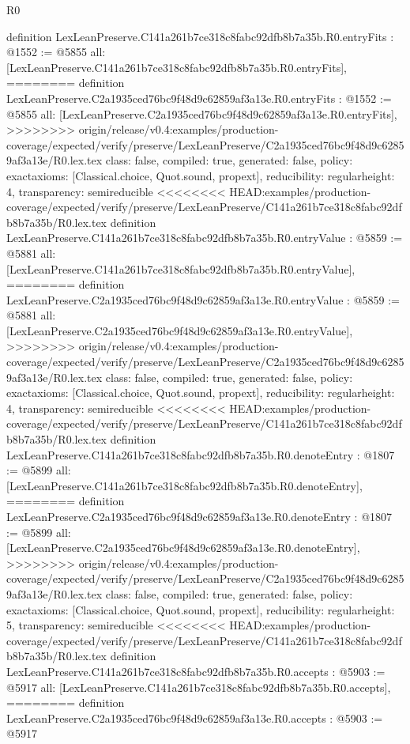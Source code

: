 \begin{lexlean}{R0}
\begin{coremodule}
{{{{{{{{{{{{{{{{{{{{{{{{{{{{{{{{{{{{{{{{{{{{{{{{{{{{{{{{{{{{{{{{{{{{{{{{{{{{{{{{{{{{{{{{{{{{{{{{{{definition LexLeanPreserve.C141a261b7ce318c8fabc92dfb8b7a35b.R0.entryFits : @1552 := @5855 {
  all: [LexLeanPreserve.C141a261b7ce318c8fabc92dfb8b7a35b.R0.entryFits],
========
definition LexLeanPreserve.C2a1935ced76bc9f48d9c62859af3a13e.R0.entryFits : @1552 := @5855 {
  all: [LexLeanPreserve.C2a1935ced76bc9f48d9c62859af3a13e.R0.entryFits],
>>>>>>>> origin/release/v0.4:examples/production-coverage/expected/verify/preserve/LexLeanPreserve/C2a1935ced76bc9f48d9c62859af3a13e/R0.lex.tex
  class: false,
  compiled: true,
  generated: false,
  policy: exact{axioms: [Classical.choice, Quot.sound, propext]},
  reducibility: regular{height: 4},
  transparency: semireducible
}
<<<<<<<< HEAD:examples/production-coverage/expected/verify/preserve/LexLeanPreserve/C141a261b7ce318c8fabc92dfb8b7a35b/R0.lex.tex
definition LexLeanPreserve.C141a261b7ce318c8fabc92dfb8b7a35b.R0.entryValue : @5859 := @5881 {
  all: [LexLeanPreserve.C141a261b7ce318c8fabc92dfb8b7a35b.R0.entryValue],
========
definition LexLeanPreserve.C2a1935ced76bc9f48d9c62859af3a13e.R0.entryValue : @5859 := @5881 {
  all: [LexLeanPreserve.C2a1935ced76bc9f48d9c62859af3a13e.R0.entryValue],
>>>>>>>> origin/release/v0.4:examples/production-coverage/expected/verify/preserve/LexLeanPreserve/C2a1935ced76bc9f48d9c62859af3a13e/R0.lex.tex
  class: false,
  compiled: true,
  generated: false,
  policy: exact{axioms: [Classical.choice, Quot.sound, propext]},
  reducibility: regular{height: 4},
  transparency: semireducible
}
<<<<<<<< HEAD:examples/production-coverage/expected/verify/preserve/LexLeanPreserve/C141a261b7ce318c8fabc92dfb8b7a35b/R0.lex.tex
definition LexLeanPreserve.C141a261b7ce318c8fabc92dfb8b7a35b.R0.denoteEntry : @1807 := @5899 {
  all: [LexLeanPreserve.C141a261b7ce318c8fabc92dfb8b7a35b.R0.denoteEntry],
========
definition LexLeanPreserve.C2a1935ced76bc9f48d9c62859af3a13e.R0.denoteEntry : @1807 := @5899 {
  all: [LexLeanPreserve.C2a1935ced76bc9f48d9c62859af3a13e.R0.denoteEntry],
>>>>>>>> origin/release/v0.4:examples/production-coverage/expected/verify/preserve/LexLeanPreserve/C2a1935ced76bc9f48d9c62859af3a13e/R0.lex.tex
  class: false,
  compiled: true,
  generated: false,
  policy: exact{axioms: [Classical.choice, Quot.sound, propext]},
  reducibility: regular{height: 5},
  transparency: semireducible
}
<<<<<<<< HEAD:examples/production-coverage/expected/verify/preserve/LexLeanPreserve/C141a261b7ce318c8fabc92dfb8b7a35b/R0.lex.tex
definition LexLeanPreserve.C141a261b7ce318c8fabc92dfb8b7a35b.R0.accepts : @5903 := @5917 {
  all: [LexLeanPreserve.C141a261b7ce318c8fabc92dfb8b7a35b.R0.accepts],
========
definition LexLeanPreserve.C2a1935ced76bc9f48d9c62859af3a13e.R0.accepts : @5903 := @5917 {
}}}}}}}}}}}}}}}}}}}}}}}}}}}}}}}}}}}}}}}}}}}}}}}}}}}}}}}}}}}}}}}}}}}}}}}}}}}}}}}}}}}}}}}}}}}}}}}}}}}}}}}
\end{coremodule}
\end{lexlean}
